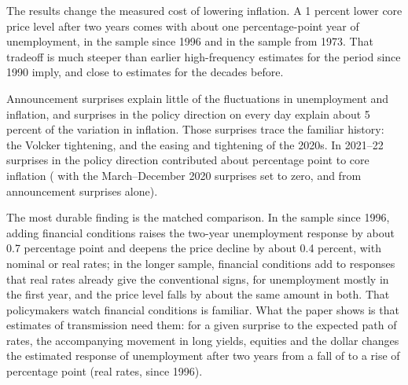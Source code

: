 \documentclass[11pt]{article}
\begin{document}
The results change the measured cost of lowering inflation. A 1 percent lower core price level after two years comes with about one percentage-point year of unemployment,  in the sample since 1996 and  in the sample from 1973. That tradeoff is much steeper than earlier high-frequency estimates for the period since 1990 imply, and close to estimates for the decades before.

Announcement surprises explain little of the fluctuations in unemployment and inflation, and surprises in the policy direction on every day explain about 5 percent of the variation in inflation. Those surprises trace the familiar history: the Volcker tightening, and the easing and tightening of the 2020s. In 2021--22 surprises in the policy direction contributed about  percentage point to core inflation ( with the March--December 2020 surprises set to zero, and  from announcement surprises alone).

The most durable finding is the matched comparison. In the sample since 1996, adding financial conditions raises the two-year unemployment response by about 0.7 percentage point and deepens the price decline by about 0.4 percent, with nominal or real rates; in the longer sample, financial conditions add to responses that real rates already give the conventional signs, for unemployment mostly in the first year, and the price level falls by about the same amount in both. That policymakers watch financial conditions is familiar. What the paper shows is that estimates of transmission need them: for a given surprise to the expected path of rates, the accompanying movement in long yields, equities and the dollar changes the estimated response of unemployment after two years from a fall of  to a rise of  percentage point (real rates, since 1996).

\FloatBarrier


\end{document}
